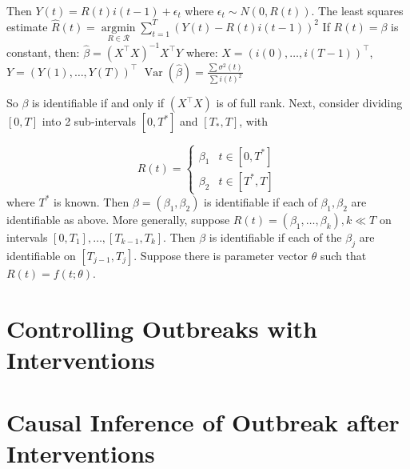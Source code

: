 \documentclass[11pt,a4paper,titlepage]{article}
\theoremstyle{definition}
\begin{document}
Then $Y(t) = R(t) i(t-1) + \epsilon_t$ where $\epsilon_t \sim N(0, R(t))$.
The least squares estimate $\hat{R}(t) = \mathop{\mathrm{argmin}}\limits_{R \in \mathcal{R}} \sum\limits_{t=1}^{T} {\left( Y(t) - R(t)i(t-1) \right)^2}$
If $R(t) = \beta$ is constant, then:
$\hat{\beta} = \left(X^{\top} X\right)^{-1}X^{\top} Y$  where:
$X = (i(0), \ldots, i(T-1))^{\top}$,
$Y = (Y(1), \ldots, Y(T))^{\top}$
$\operatorname{Var}(\hat{\beta}) = \frac{\sum{\sigma^2(t)}}{\sum{i(t)^2}}$

So $\beta$ is identifiable if and only if $(X^{\top}X)$ is of full rank.
Next, consider dividing $[0,T]$ into 2 sub-intervals $[0, T^{*}]$ and $[T_{*}, T]$, with

$$
    R(t) =
    \begin{cases}
        \beta_1 & t \in [0,T^{*}] \\
        \beta_2 & t \in [T^{*}, T]
    \end{cases}
$$
where $T^{*}$ is known.
Then $\beta = (\beta_1, \beta_2)$ is identifiable if each of $\beta_1, \beta_2$ are identifiable as above.
More generally, suppose $R(t) = (\beta_1, \ldots, \beta_k), k \ll T$ on intervals $[0, T_1], \ldots, [T_{k-1}, T_k]$. Then $\beta$ is identifiable if each of the $\beta_j$ are identifiable on $[T_{j-1}, T_j]$.
Suppose there is parameter vector $\theta$ such that $R(t) = f(t; \theta)$.



\section{Controlling Outbreaks with Interventions}
\label{sec:control}

\section{Causal Inference of Outbreak after Interventions}
\label{sec:causal}




\printbibliography
\label{sec:bibliography}
\end{document}
